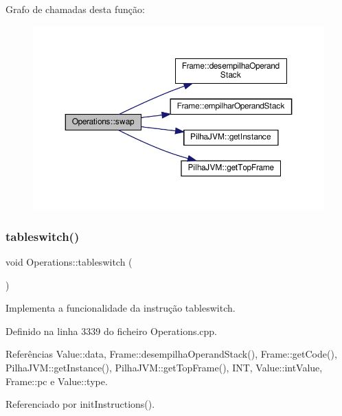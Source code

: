 Grafo de chamadas desta função\+:
\nopagebreak
\begin{figure}[H]
\begin{center}
\leavevmode
\includegraphics[width=350pt]{classOperations_ad800d04ce11806455dd5b84a7ecd6144_cgraph}
\end{center}
\end{figure}
\mbox{\label{classOperations_a72955f43cde98b73c503e1a8c1505352}} 
\subsubsection{\texorpdfstring{tableswitch()}{tableswitch()}}
{\footnotesize\ttfamily void Operations\+::tableswitch (\begin{DoxyParamCaption}{ }\end{DoxyParamCaption})\hspace{0.3cm}{\ttfamily [private]}}



Implementa a funcionalidade da instrução tableswitch. 



Definido na linha 3339 do ficheiro Operations.\+cpp.



Referências Value\+::data, Frame\+::desempilha\+Operand\+Stack(), Frame\+::get\+Code(), Pilha\+J\+V\+M\+::get\+Instance(), Pilha\+J\+V\+M\+::get\+Top\+Frame(), I\+NT, Value\+::int\+Value, Frame\+::pc e Value\+::type.



Referenciado por init\+Instructions().


